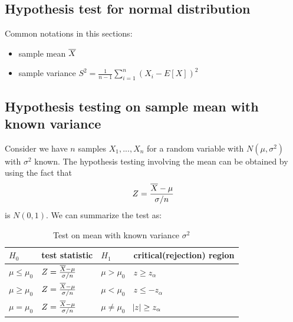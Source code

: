 \begin{refsection}
\subsection{Hypothesis test for normal distribution}

\begin{mdframed}
	Common notations in this sections:
	\begin{itemize}
		\item sample mean $\overline{X}$
		\item sample variance $S^2 = \frac{1}{n-1} \sum_{i=1}^{n} (X_i - E[X])^2$
	\end{itemize}
\end{mdframed}


\subsection{Hypothesis testing on sample mean with known variance}
Consider we have $n$ samples $X_1,...,X_n$ for a random variable with $N(\mu,\sigma^2)$ with $\sigma^2$ known. The hypothesis testing involving the mean can be obtained by using the fact that $$Z = \frac{\overline{X} - \mu}{\sigma/n}$$ is $N(0,1)$. We can summarize the test as:
\begin{table}[H]
	\centering
	\caption{Test on mean with known variance $\sigma^2$}
	\begin{tabular}{|l|l|l|l|}
		\hline
		$H_0$	& test statistic  & $H_1$ & critical(rejection) region \\ \hline
		$\mu \leq \mu_0$ &$Z = \frac{\overline{X} - \mu}{\sigma/n}$ & $\mu > \mu_0$
		&  $z\geq z_\alpha$ \\ \hline
		$\mu \geq \mu_0$ & $Z = \frac{\overline{X} - \mu}{\sigma/n}$ & $\mu < \mu_0$
		& $z\leq -z_\alpha$ \\ \hline
		$\mu = \mu_0$ &  $Z = \frac{\overline{X} - \mu}{\sigma/n}$ & $\mu \neq \mu_0$
		&  $\abs{z}\geq z_\alpha$\\ \hline
	\end{tabular}
\end{table}



\end{refsection}
